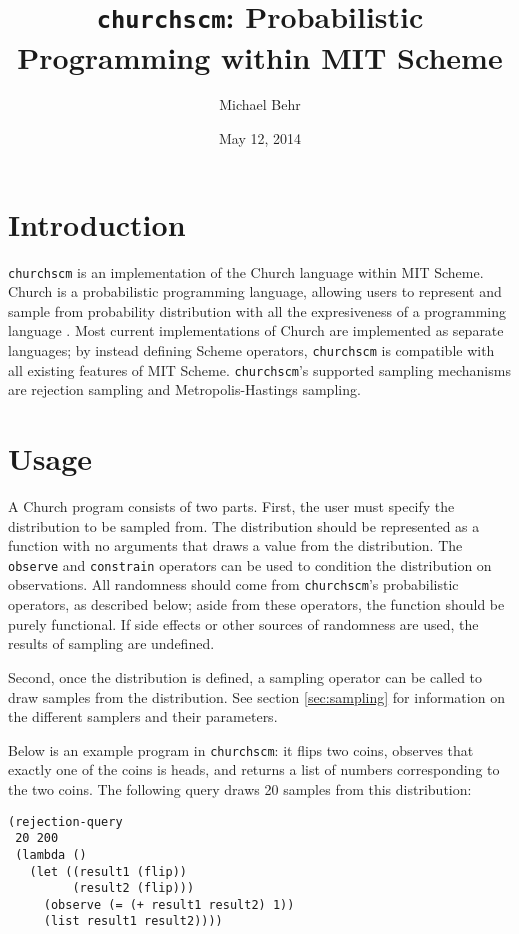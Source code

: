 \documentclass{article}
\title{\texttt{churchscm}: Probabilistic Programming within MIT Scheme}
\author{Michael Behr}
\date{May 12, 2014}
\begin{document}
\maketitle

\section{Introduction}

\texttt{churchscm} is an implementation of the Church language within
MIT Scheme. Church is a probabilistic programming language, allowing
users to represent and sample from probability distribution with all
the expresiveness of a programming language
\cite{goodman_church:_2012}. Most current implementations of Church
are implemented as separate languages; by instead defining Scheme
operators, \texttt{churchscm} is compatible with all existing features
of MIT Scheme. \texttt{churchscm}'s supported sampling mechanisms are
rejection sampling and Metropolis-Hastings sampling.

\section{Usage}

A Church program consists of two parts. First, the user must specify
the distribution to be sampled from. The distribution should be
represented as a function with no arguments that draws a value from
the distribution. The \texttt{observe} and \texttt{constrain}
operators can be used to condition the distribution on
observations. All randomness should come from \texttt{churchscm}'s
probabilistic operators, as described below; aside from these
operators, the function should be purely functional. If side effects
or other sources of randomness are used, the results of sampling are
undefined.

Second, once the distribution is defined, a sampling operator can be
called to draw samples from the distribution. See section
\ref{sec:sampling} for information on the different samplers and their
parameters.

Below is an example program in \texttt{churchscm}: it flips two coins,
observes that exactly one of the coins is heads, and returns a list of
numbers corresponding to the two coins. The following query draws 20
samples from this distribution:

\begin{lstlisting}
(rejection-query
 20 200
 (lambda ()
   (let ((result1 (flip))
         (result2 (flip)))
     (observe (= (+ result1 result2) 1))
     (list result1 result2))))
\end{lstlisting}
\end{document}
